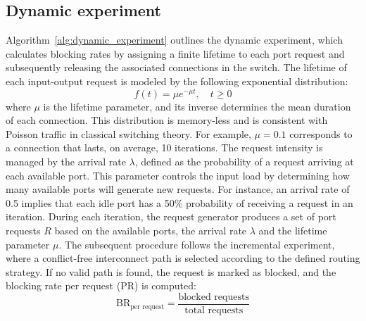 \subsection{Dynamic experiment}\label{subsection:dynamic_experiment}
Algorithm~\ref{alg:dynamic_experiment} outlines the dynamic experiment, which calculates blocking rates by assigning a finite lifetime to each port request and subsequently releasing the associated connections in the switch.
The lifetime of each input-output request is modeled by the following exponential distribution:
\begin{equation}
    f(t) = \mu e^{-\mu t}, \quad t \ge 0
    \label{eq:lifetime}
\end{equation}
where $\mu$ is the lifetime parameter, and its inverse determines the mean duration of each connection.
This distribution is memory-less and is consistent with Poisson traffic in classical switching theory.
For example, $\mu = 0.1$ corresponds to a connection that lasts, on average, 10 iterations.
The request intensity is managed by the arrival rate $\lambda$, defined as the probability of a request arriving at each available port.
This parameter controls the input load by determining how many available ports will generate new requests.
For instance, an arrival rate of 0.5 implies that each idle port has a 50\% probability of receiving a request in an iteration.
During each iteration, the request generator produces a set of port requests $R$ based on the available ports, the arrival rate $\lambda$ and the lifetime parameter $\mu$.
The subsequent procedure follows the incremental experiment, where a conflict-free interconnect path is selected according to the defined routing strategy.
If no valid path is found, the request is marked as blocked, and the blocking rate per request (PR) is computed:
\begin{equation}
    \text{BR}_{\text{per request}} = \frac{\text{blocked requests}}{\text{total requests}}
    \label{eq:br_pr}
\end{equation}
